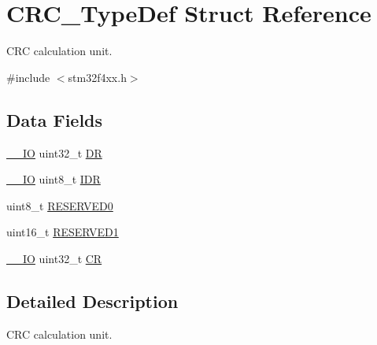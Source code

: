 \hypertarget{struct_c_r_c___type_def}{\section{C\-R\-C\-\_\-\-Type\-Def Struct Reference}
\label{struct_c_r_c___type_def}
}


C\-R\-C calculation unit.  




{\ttfamily \#include $<$stm32f4xx.\-h$>$}

\subsection*{Data Fields}
\begin{DoxyCompactItemize}
\item 
\hyperlink{group___c_m_s_i_s__core__definitions_gaec43007d9998a0a0e01faede4133d6be}{\-\_\-\-\_\-\-I\-O} uint32\-\_\-t \hyperlink{struct_c_r_c___type_def_a3df0d8dfcd1ec958659ffe21eb64fa94}{D\-R}
\item 
\hyperlink{group___c_m_s_i_s__core__definitions_gaec43007d9998a0a0e01faede4133d6be}{\-\_\-\-\_\-\-I\-O} uint8\-\_\-t \hyperlink{struct_c_r_c___type_def_a601d7b0ba761c987db359b2d7173b7e0}{I\-D\-R}
\item 
uint8\-\_\-t \hyperlink{struct_c_r_c___type_def_aa7d2bd5481ee985778c410a7e5826b71}{R\-E\-S\-E\-R\-V\-E\-D0}
\item 
uint16\-\_\-t \hyperlink{struct_c_r_c___type_def_a8249a3955aace28d92109b391311eb30}{R\-E\-S\-E\-R\-V\-E\-D1}
\item 
\hyperlink{group___c_m_s_i_s__core__definitions_gaec43007d9998a0a0e01faede4133d6be}{\-\_\-\-\_\-\-I\-O} uint32\-\_\-t \hyperlink{struct_c_r_c___type_def_ab40c89c59391aaa9d9a8ec011dd0907a}{C\-R}
\end{DoxyCompactItemize}


\subsection{Detailed Description}
C\-R\-C calculation unit. 

